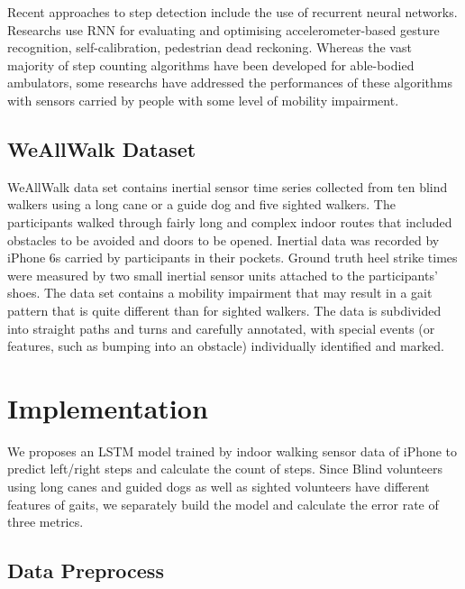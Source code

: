\documentclass[11pt]{article}
\begin{document}
Recent approaches to step detection include the use of recurrent neural networks. Researchs use RNN for evaluating and optimising accelerometer-based gesture recognition, self-calibration, pedestrian dead reckoning. Whereas the vast majority of step counting algorithms have been developed for able-bodied ambulators, some researchs have addressed the performances of these algorithms with sensors carried by people with some level of mobility impairment. 



\subsection{WeAllWalk Dataset}
WeAllWalk data set contains inertial sensor time series collected from ten blind walkers using a long cane or a guide dog and five sighted walkers. The participants walked through fairly long and complex indoor routes that included obstacles to be avoided and doors to be opened. Inertial data was recorded by iPhone 6s carried by participants in their pockets. Ground truth heel strike times were measured by two small inertial sensor units attached to the participants’ shoes. The data set contains a mobility impairment that may result in a gait pattern that is quite different than for sighted walkers. The data is subdivided into straight paths and turns and carefully annotated, with special events (or features, such as bumping into an obstacle) individually identified and marked.


\section{Implementation}
We proposes an LSTM model trained by indoor walking sensor data of iPhone to predict left/right steps and calculate the count of steps. Since Blind volunteers using long canes and guided dogs as well as sighted volunteers have different features of gaits, we separately build the model and calculate the error rate of three metrics.

\subsection{Data Preprocess}
\end{document}
